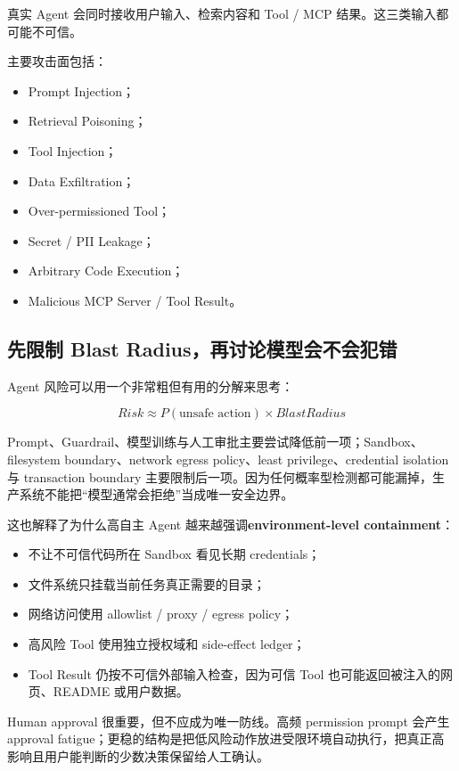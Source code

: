 \documentclass[profile=standard,twoside=false]{ipara-handbook}
\begin{document}
真实 Agent 会同时接收用户输入、检索内容和 Tool / MCP 结果。这三类输入都可能不可信。

主要攻击面包括：

\begin{itemize}
  \item Prompt Injection；
  \item Retrieval Poisoning；
  \item Tool Injection；
  \item Data Exfiltration；
  \item Over-permissioned Tool；
  \item Secret / PII Leakage；
  \item Arbitrary Code Execution；
  \item Malicious MCP Server / Tool Result。
\end{itemize}

\subsection{先限制 Blast Radius，再讨论模型会不会犯错}

Agent 风险可以用一个非常粗但有用的分解来思考：

$$
\boxed{
Risk\approx P(\text{unsafe action})\times BlastRadius
}
$$

Prompt、Guardrail、模型训练与人工审批主要尝试降低前一项；Sandbox、filesystem boundary、network egress policy、least privilege、credential isolation 与 transaction boundary 主要限制后一项。因为任何概率型检测都可能漏掉，生产系统不能把“模型通常会拒绝”当成唯一安全边界。

这也解释了为什么高自主 Agent 越来越强调\textbf{environment-level containment}：

\begin{itemize}
  \item 不让不可信代码所在 Sandbox 看见长期 credentials；
  \item 文件系统只挂载当前任务真正需要的目录；
  \item 网络访问使用 allowlist / proxy / egress policy；
  \item 高风险 Tool 使用独立授权域和 side-effect ledger；
  \item Tool Result 仍按不可信外部输入检查，因为可信 Tool 也可能返回被注入的网页、README 或用户数据。
\end{itemize}

Human approval 很重要，但不应成为唯一防线。高频 permission prompt 会产生 approval fatigue；更稳的结构是把低风险动作放进受限环境自动执行，把真正高影响且用户能判断的少数决策保留给人工确认。
\end{document}
